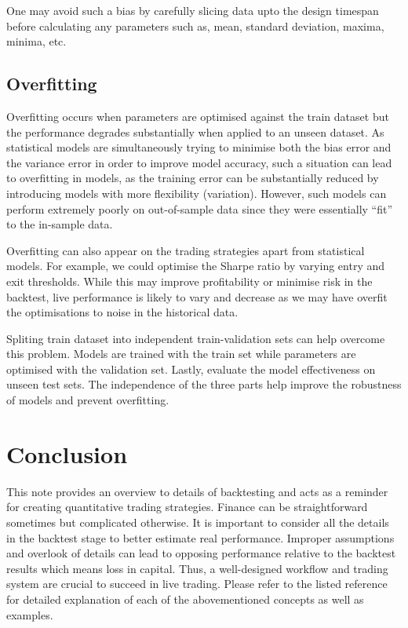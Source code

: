 \documentclass[12pt]{article}
\begin{document}
One may avoid such a bias by carefully slicing data upto the design timespan before calculating any parameters such as, mean, standard deviation, maxima, minima, etc.

\subsection{Overfitting}

Overfitting occurs when parameters are optimised against the train dataset but the performance degrades substantially when applied to an unseen dataset. As statistical models are simultaneously trying to minimise both the bias error and the variance error in order to improve model accuracy, such a situation can lead to overfitting in models, as the training error can be substantially reduced by introducing models with more flexibility (variation). However, such models can perform extremely poorly on out-of-sample data since they were essentially “fit” to the in-sample data.

Overfitting can also appear on the trading strategies apart from statistical models. For example, we could optimise the Sharpe ratio by varying entry and exit thresholds. While this may improve profitability or minimise risk in the backtest, live performance is likely to vary and decrease as we may have overfit the optimisations to noise in the historical data.

Spliting train dataset into independent train-validation sets can help overcome this problem. Models are trained with the train set while parameters are optimised with the validation set. Lastly, evaluate the model effectiveness on unseen test sets. The independence of the three parts help improve the robustness of models and prevent overfitting.

\section*{Conclusion}

This note provides an overview to details of backtesting and acts as a reminder for creating quantitative trading strategies. Finance can be straightforward sometimes but complicated otherwise. It is important to consider all the details in the backtest stage to better estimate real performance. Improper assumptions and overlook of details can lead to opposing performance relative to the backtest results which means loss in capital. Thus, a well-designed workflow and trading system are crucial to succeed in live trading. Please refer to the listed reference for detailed explanation of each of the abovementioned concepts as well as examples.

\renewcommand{\refname}{Reference}
\printbibliography
\end{document}
